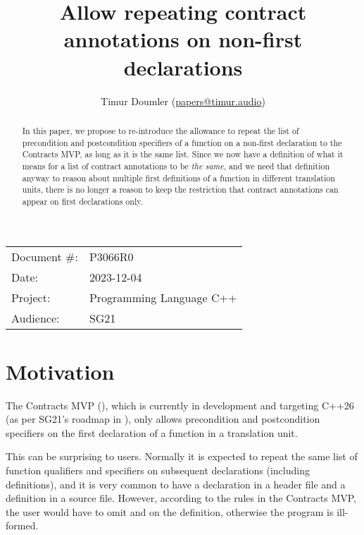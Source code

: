 

 \usepackage[bottom]{footmisc} 


\title{Allow repeating contract annotations on non-first declarations}
\author{ Timur Doumler \small(\href{mailto:papers@timur.audio}{papers@timur.audio}) 
}
\date{}
\maketitle

\begin{tabular}{ll}
Document \#: & P3066R0 \\
Date: &2023-12-04 \\
Project: & Programming Language C++ \\
Audience: & SG21
\end{tabular}

\begin{abstract}
In this paper, we propose to re-introduce the allowance to repeat the list of precondition and postcondition specifiers of a function on a non-first declaration to the Contracts MVP, as long as it is the same list. Since we now have a definition of what it means for a list of contract annotations to be \emph{the same}, and we need that definition anyway to reason about multiple first definitions of a function in different translation units, there is no longer a reason to keep the restriction that contract annotations can appear on first declarations only.
\end{abstract}

\section{Motivation}
\label{sec:intro}

The Contracts MVP (\cite{P2900R2}), which is currently in development and targeting C++26 (as per SG21's roadmap in \cite{P2695R1}), only allows precondition and postcondition specifiers on the first declaration of a function in a translation unit.

This can be surprising to users. Normally it is expected to repeat the same list of function qualifiers and specifiers on subsequent declarations (including definitions), and it is very common to have a declaration in a header file and a definition in a source file. However, according to the rules in the Contracts MVP, the user would have to omit  and  on the definition, otherwise the program is ill-formed.

